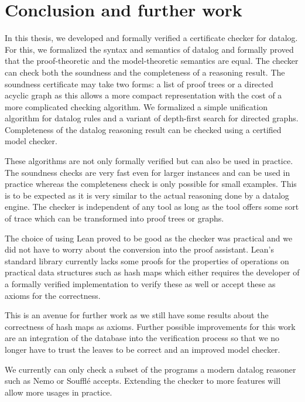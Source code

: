 \chapter{Conclusion and further work}

In this thesis, we developed and formally verified a certificate checker for datalog. For this, we formalized the syntax and semantics of datalog and formally proved that the proof-theoretic and the model-theoretic semantics are equal. The checker can check both the soundness and the completeness of a reasoning result. The soundness certificate may take two forms: a list of proof trees or a directed acyclic graph as this allows a more compact representation with the cost of a more complicated checking algorithm. We formalized a simple unification algorithm for datalog rules and a variant of depth-first search for directed graphs. Completeness of the datalog reasoning result can be checked using a certified model checker. 

These algorithms are not only formally verified but can also be used in practice. The soundness checks are very fast even for larger instances and can be used in practice whereas the completeness check is only possible for small examples. This is to be expected as it is very similar to the actual reasoning done by a datalog engine. The checker is independent of any tool as long as the tool offers some sort of trace which can be transformed into proof trees or graphs.

The choice of using Lean proved to be good as the checker was practical and we did not have to worry about the conversion into the proof assistant. Lean's standard library currently lacks some proofs for the properties of operations on practical data structures such as hash maps which either requires the developer of a formally verified implementation to verify these as well or accept these as axioms for the correctness.

This is an avenue for further work as we still have some results about the correctness of hash maps as axioms. Further possible improvements for this work are an integration of the database into the verification process so that we no longer have to trust the leaves to be correct and an improved model checker.

We currently can only check a subset of the programs a modern datalog reasoner such as Nemo or Soufflé accepts. Extending the checker to more features will allow more usages in practice. 

